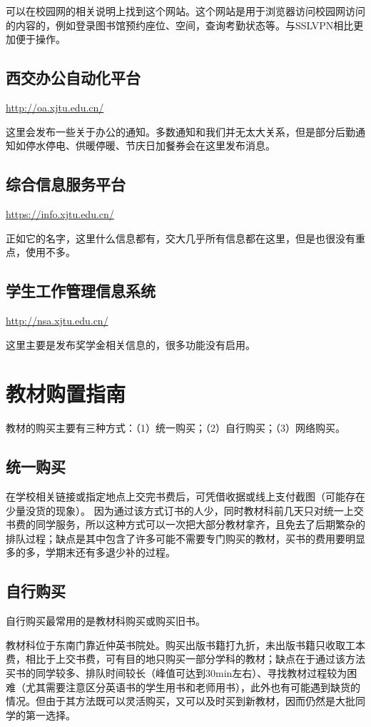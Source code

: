 \documentclass[
decoration,  %
]{qyxf-book}
\begin{document}
可以在校园网的相关说明上找到这个网站。这个网站是用于浏览器访问校园网访问的内容的，例如登录图书馆预约座位、空间，查询考勤状态等。与SSLVPN相比更加便于操作。

\subsection{西交办公自动化平台}
\url{http://oa.xjtu.edu.cn/}

这里会发布一些关于办公的通知。多数通知和我们并无太大关系，但是部分后勤通知如停水停电、供暖停暖、节庆日加餐券会在这里发布消息。

\subsection{综合信息服务平台}
\url{https://info.xjtu.edu.cn/}

正如它的名字，这里什么信息都有，交大几乎所有信息都在这里，但是也很没有重点，使用不多。

\subsection{学生工作管理信息系统}
\url{http://nsa.xjtu.edu.cn/}

这里主要是发布奖学金相关信息的，很多功能没有启用。

\section{教材购置指南}
教材的购买主要有三种方式：（1）统一购买；（2）自行购买；（3）网络购买。

\subsection{统一购买}
在学校相关链接或指定地点上交完书费后，可凭借收据或线上支付截图（可能存在少量没货的现象）。 因为通过该方式订书的人少，同时教材科前几天只对统一上交书费的同学服务，所以这种方式可以一次把大部分教材拿齐，且免去了后期繁杂的排队过程；缺点是其中包含了许多可能不需要专门购买的教材，买书的费用要明显多的多，学期末还有多退少补的过程。

\subsection{自行购买}
自行购买最常用的是教材科购买或购买旧书。

教材科位于东南门靠近仲英书院处。购买出版书籍打九折，未出版书籍只收取工本费，相比于上交书费，可有目的地只购买一部分学科的教材；缺点在于通过该方法买书的同学较多、排队时间较长（峰值可达到30min左右）、寻找教材过程较为困难（尤其需要注意区分英语书的学生用书和老师用书），此外也有可能遇到缺货的情况。但由于其方法既可以灵活购买，又可以及时买到新教材，因而仍然是大批同学的第一选择。
\end{document}
